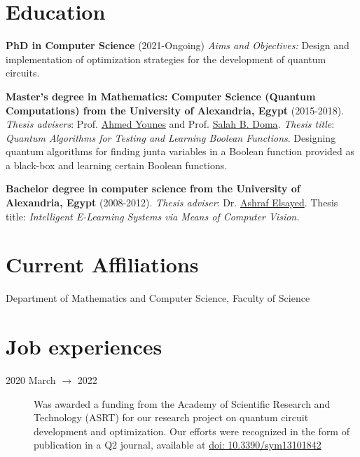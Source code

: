 \documentclass[margin,line]{resume}
\newcommand*{\doi}[1]{\href{http://dx.doi.org/#1}{doi: #1}}
\begin{document}
\begin{resume}
	\section{\mysidestyle Education}
	\textbf{PhD in Computer Science} (2021-Ongoing)
	\emph{Aims and Objectives:} Design and implementation of optimization strategies for the development of quantum circuits.

	\textbf{Master's degree in Mathematics: Computer Science (Quantum Computations) from the University of Alexandria, Egypt} (2015-2018).
	\emph{Thesis advisers}: Prof.  \href{https://scholar.google.com.eg/citations?user=CZz2XFIAAAAJ&hl=en}{Ahmed Younes} and Prof. \href{https://scholar.google.com.eg/citations?hl=en&user=YFeMsegAAAAJ&view_op=list_works&sortby=pubdate}{Salah B. Doma}.
	\emph{Thesis title}: \textit{Quantum Algorithms for Testing and Learning Boolean Functions}. Designing quantum algorithms for finding junta variables in a Boolean function provided as a black-box and learning certain Boolean functions.

	\textbf{Bachelor degree in computer science from the University of Alexandria, Egypt}
	(2008-2012).  \emph{Thesis adviser}: Dr. \href{https://scholar.google.com.eg/citations?hl=en&user=G9tQkdIAAAAJ&view_op=list_works&sortby=pubdate}{Ashraf Elsayed}.
	Thesis title: \textit{Intelligent E-Learning Systems via Means of Computer Vision.}


	\section{\mysidestyle Current Affiliations}\vspace{1mm}
	\begin{description}
		\item[Department of Mathematics and Computer Science, Faculty of Science]
	\end{description}


	\section{\mysidestyle Job experiences}\vspace{1mm}
	\begin{description}


		\item[2020 March $\rightarrow$ 2022] Was awarded a funding from the Academy of Scientific Research and Technology (ASRT) for our research project on quantum circuit development and optimization. Our efforts were recognized in the form of publication in a Q2 journal, available at \doi{10.3390/sym13101842}


\end{description}
\end{resume}
\end{document}
